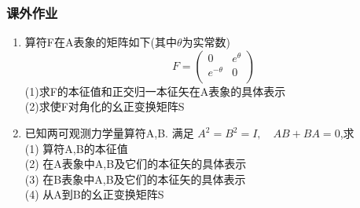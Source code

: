 \begin{frame}
    \frametitle{课外作业}
    \begin{enumerate}
        \item 算符F在A表象的矩阵如下(其中$\theta$为实常数) \\ 
        \[ F= \begin{pmatrix}
          0 & e^{\theta} \\
          e^{-\theta} & 0 \\
        \end{pmatrix} \]
        (1)求F的本征值和正交归一本征矢在A表象的具体表示\\
        (2)求使F对角化的幺正变换矩阵S
        \item 已知两可观测力学量算符A,B. 满足 $A^2=B^2=I, \quad AB+BA=0$,求 \\ 
              (1) 算符A,B的本征值 \\ 
              (2) 在A表象中A,B及它们的本征矢的具体表示 \\ 
              (3) 在B表象中A,B及它们的本征矢的具体表示 \\ 
              (4) 从A到B的幺正变换矩阵S
    \end{enumerate}
\end{frame}

 

